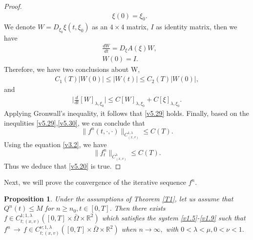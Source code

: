 \documentclass[11pt,reqno]{amsart}%
\newtheorem{Proposition}{Proposition}[section]
\theoremstyle{definition}
\theoremstyle{remark}
\begin{document}
\begin{proof}
\begin{align}
&\xi(0)=\xi_{0}.\nonumber
\end{align}
We denote $W=D_{\xi_{0}} \xi (t,\xi_{0}) $ as an $4\times4$ matrix, $I$ as identity matrix, then we have
\begin{align}
&\frac{d W}{d t}=D_{\xi}A(\xi) W,\nonumber \\
&W(0)=I.\nonumber
\end{align}
Therefore,  we have two conclusions about W, 
\begin{align}
C_{1}(T)|W(0)|\leq |W(t)|\leq C_{2}(T)|W(0)|,\label{v5.30}
\end{align}
and  
\begin{align}
\Big|\frac{d}{ d t}[W]_{\lambda,\xi_{0}}\Big|\leq C[W]_{\lambda,\xi_{0}}+C[\xi]_{\lambda,\xi_{0}}.\nonumber
\end{align}
Applying Gronwall's inequality, it follows that \eqref{v5.29} holds.
Finally, based on the inequlities \eqref{v5.29},\eqref{v5.30}, we can conclude that
$$\|f^{n}(t,\cdot,\cdot)\|_{C^{1,\lambda}_{(x,v)}}\leq C(T).$$
Using the equation \eqref{v3.2}, we have
$$\|f^{n}_{t}\|_{C^{\lambda}_{(x,v)}}\leq C(T).$$
Thus we deduce that \eqref{v5.20} is true.
\end{proof}

Next, we will prove the convergence of the iterative sequence $f^{n}$.
\begin{Proposition}\label{P5}
Under the assumptions of Theorem \ref{T1}, let us assume that $Q^{n}(t)\leq M$ for $n\geq n_{0}, t\in [0,T]$. Then there exists $f\in C^{1;1,\lambda}_{t;(x,v)}([0,T]\times \bar{\Omega}\times \mathbb{R}^{2})$ which satisfies the system \eqref{v1.5}-\eqref{v1.9} such that $f^{n}\,\rightarrow \,f\in C^{\nu;1,\lambda}_{t;(x,v)}([0,T]\times \bar{\Omega}\times \mathbb{R}^{2})$ when $n\rightarrow \infty, $ with $0<\lambda<\mu, 0<\nu<1.$
\end{Proposition}
\end{document}
